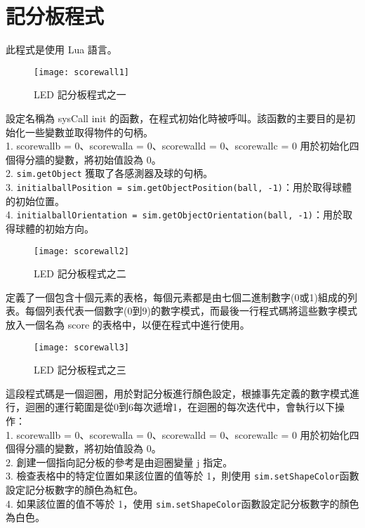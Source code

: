\section{記分板程式}
此程式是使用 Lua 語言。\\
\begin{figure}[hbt!]
\begin{center}
\texttt{[image: scorewall1]}
\caption{\Large LED 記分板程式之一}\label{LED 記分板程式之一}
\end{center}
\end{figure} 
設定名稱為 sysCall init 的函數，在程式初始化時被呼叫。該函數的主要目的是初始化一些變數並取得物件的句柄。\\
1. scorewallb = 0、scorewalla = 0、scorewalld = 0、scorewallc = 0 用於初始化四個得分牆的變數，將初始值設為 0。\\
2. \texttt{sim.getObject} 獲取了各感測器及球的句柄。\\
3. \texttt{initialballPosition = sim.getObjectPosition(ball, -1)}：用於取得球體的初始位置。\\
4. \texttt{initialballOrientation = sim.getObjectOrientation(ball, -1)}：用於取得球體的初始方向。\\
\newpage

\begin{figure}[hbt!]
\begin{center}
\texttt{[image: scorewall2]}
\caption{\Large LED 記分板程式之二}\label{LED 記分板程式之二}
\end{center}
\end{figure} 
定義了一個包含十個元素的表格，每個元素都是由七個二進制數字(0或1)組成的列表。每個列表代表一個數字(0到9)的數字模式，而最後一行程式碼將這些數字模式放入一個名為 score 的表格中，以便在程式中進行使用。\\
\newpage

\begin{figure}[hbt!]
\begin{center}
\texttt{[image: scorewall3]}
\caption{\Large LED 記分板程式之三}\label{LED 記分板程式之三}
\end{center}
\end{figure}
這段程式碼是一個迴圈，用於對記分板進行顏色設定，根據事先定義的數字模式進行，迴圈的運行範圍是從0到6每次遞增1，在迴圈的每次迭代中，會執行以下操作：\\
1. scorewallb = 0、scorewalla = 0、scorewalld = 0、scorewallc = 0 用於初始化四個得分牆的變數，將初始值設為 0。\\
2. 創建一個指向記分板的參考是由迴圈變量 j 指定。\\
3. 檢查表格中的特定位置如果該位置的值等於 1，則使用 \texttt{sim.setShapeColor}函數設定記分板數字的顏色為紅色。\\
4. 如果該位置的值不等於 1，使用 \texttt{sim.setShapeColor}函數設定記分板數字的顏色為白色。\\
\newpage

